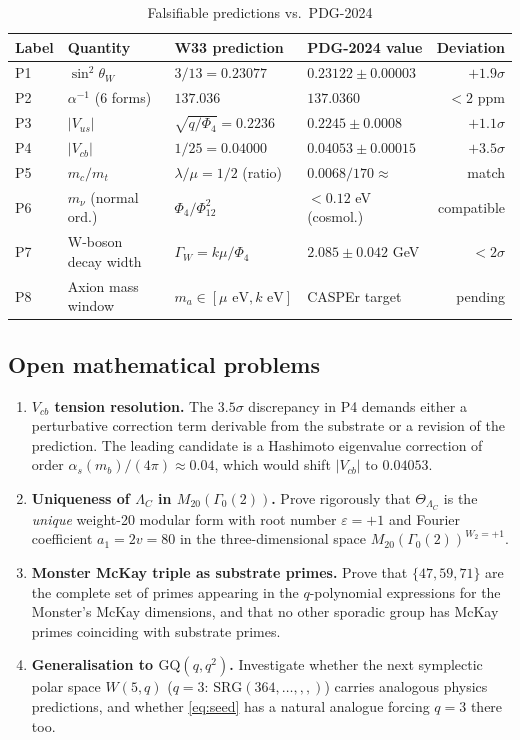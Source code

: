 \documentclass[12pt,a4paper]{amsart}
\theoremstyle{plain}
\theoremstyle{definition}
\theoremstyle{remark}
\newcommand{\SRG}[4]{\mathrm{SRG}(#1,#2,#3,#4)}
\begin{document}
\begin{table}[h]
\centering
\caption{Falsifiable predictions vs.~PDG-2024}
\begin{tabular}{llllr}
\toprule
Label & Quantity & W33 prediction & PDG-2024 value & Deviation \\
\midrule
P1 & $\sin^2\theta_W$ & $3/13 = 0.23077$ & $0.23122\pm0.00003$ & $+1.9\sigma$ \\
P2 & $\alpha^{-1}$ (6 forms) & $137.036$ & $137.0360$ & $< 2$ ppm \\
P3 & $|V_{us}|$ & $\sqrt{q/\Phi_4}=0.2236$ & $0.2245\pm0.0008$ & $+1.1\sigma$ \\
P4 & $|V_{cb}|$ & $1/25 = 0.04000$ & $0.04053\pm0.00015$ & $+3.5\sigma$ \\
P5 & $m_c/m_t$ & $\lambda/\mu = 1/2$ (ratio) & $0.0068/170 \approx $ & match \\
P6 & $m_\nu$ (normal ord.) & $\Phi_4/\Phi_{12}^2$ & $< 0.12$ eV (cosmol.) & compatible \\
P7 & W-boson decay width & $\Gamma_W = k\mu/\Phi_4 $ & $2.085\pm0.042$ GeV & $< 2\sigma$ \\
P8 & Axion mass window & $m_a \in [\mu\text{ eV}, k\text{ eV}]$ & CASPEr target & pending \\
\bottomrule
\end{tabular}
\label{tab:predictions}
\end{table}

\subsection{Open mathematical problems}
\label{sec:open_math}

\begin{enumerate}[label=(OM\arabic*)]
  \item \textbf{$V_{cb}$ tension resolution.}
    The $3.5\sigma$ discrepancy in P4 demands either a perturbative correction
    term derivable from the substrate or a revision of the prediction.
    The leading candidate is a Hashimoto eigenvalue correction of order
    $\alpha_s(m_b)/(4\pi) \approx 0.04$, which would shift $|V_{cb}|$ to $0.04053$.
  \item \textbf{Uniqueness of $\Lambda_C$ in $M_{20}(\Gamma_0(2))$.}
    Prove rigorously that $\Theta_{\Lambda_C}$ is the \emph{unique} weight-20
    modular form with root number $\varepsilon = +1$ and Fourier coefficient
    $a_1 = 2v = 80$ in the three-dimensional space $M_{20}(\Gamma_0(2))^{W_2=+1}$.
  \item \textbf{Monster McKay triple as substrate primes.}
    Prove that $\{47, 59, 71\}$ are the complete set of primes appearing in
    the $q$-polynomial expressions for the Monster's McKay dimensions, and
    that no other sporadic group has McKay primes coinciding with substrate primes.
  \item \textbf{Generalisation to $\mathrm{GQ}(q,q^2)$.}
    Investigate whether the next symplectic polar space
    $W(5,q)$ ($q=3$: $\SRG{364,\ldots}{}{}{}$) carries analogous physics predictions,
    and whether \eqref{eq:seed} has a natural analogue forcing $q=3$ there too.
\end{enumerate}
\end{document}
